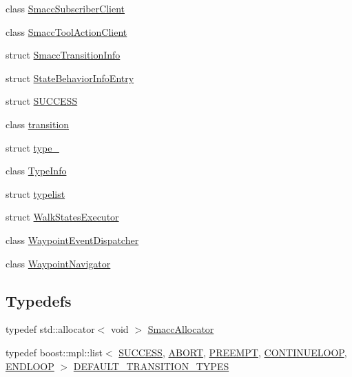 \begin{DoxyCompactItemize}
class \hyperlink{classsmacc_1_1SmaccSubscriberClient}{Smacc\+Subscriber\+Client}
\item 
class \hyperlink{classsmacc_1_1SmaccToolActionClient}{Smacc\+Tool\+Action\+Client}
\item 
struct \hyperlink{structsmacc_1_1SmaccTransitionInfo}{Smacc\+Transition\+Info}
\item 
struct \hyperlink{structsmacc_1_1StateBehaviorInfoEntry}{State\+Behavior\+Info\+Entry}
\item 
struct \hyperlink{structsmacc_1_1SUCCESS}{S\+U\+C\+C\+E\+SS}
\item 
class \hyperlink{classsmacc_1_1transition}{transition}
\item 
struct \hyperlink{structsmacc_1_1type__}{type\+\_\+}
\item 
class \hyperlink{classsmacc_1_1TypeInfo}{Type\+Info}
\item 
struct \hyperlink{structsmacc_1_1typelist}{typelist}
\item 
struct \hyperlink{structsmacc_1_1WalkStatesExecutor}{Walk\+States\+Executor}
\item 
class \hyperlink{classsmacc_1_1WaypointEventDispatcher}{Waypoint\+Event\+Dispatcher}
\item 
class \hyperlink{classsmacc_1_1WaypointNavigator}{Waypoint\+Navigator}
\end{DoxyCompactItemize}
\subsection*{Typedefs}
\begin{DoxyCompactItemize}
\item 
typedef std\+::allocator$<$ void $>$ \hyperlink{namespacesmacc_ac43548af6721e408234339fcf1ab1254}{Smacc\+Allocator}
\item 
typedef boost\+::mpl\+::list$<$ \hyperlink{structsmacc_1_1SUCCESS}{S\+U\+C\+C\+E\+SS}, \hyperlink{structsmacc_1_1ABORT}{A\+B\+O\+RT}, \hyperlink{structsmacc_1_1PREEMPT}{P\+R\+E\+E\+M\+PT}, \hyperlink{structsmacc_1_1CONTINUELOOP}{C\+O\+N\+T\+I\+N\+U\+E\+L\+O\+OP}, \hyperlink{structsmacc_1_1ENDLOOP}{E\+N\+D\+L\+O\+OP} $>$ \hyperlink{namespacesmacc_a5238572f5e2747391ba919540aaf70bd}{D\+E\+F\+A\+U\+L\+T\+\_\+\+T\+R\+A\+N\+S\+I\+T\+I\+O\+N\+\_\+\+T\+Y\+P\+ES}
\end{DoxyCompactItemize}
